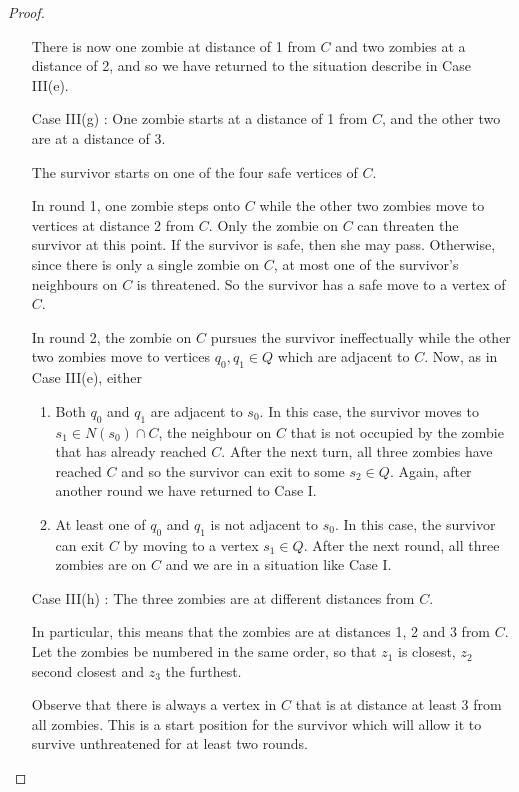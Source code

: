 \begin{proof}
\begin{enumerate}[I.]
There is now one zombie at distance of 1 from $C$ and two zombies at a distance of 2, and so we have returned to the situation describe in Case III(e).

\item[Case III(g)]: One zombie starts at a distance of 1 from $C$, and the other two are at a distance of 3.

The survivor starts on one of the four safe vertices of $C$.

In round 1, one zombie steps onto $C$ while the other two zombies move to vertices at distance 2 from $C$.
Only the zombie on $C$ can threaten the survivor at this point. If the survivor is safe, then she may pass. Otherwise, since there is
only a single zombie on $C$, at most one of the survivor's neighbours on $C$ is threatened.
So the survivor has a safe move to a vertex of $C$.

In round 2, the zombie on $C$ pursues the survivor ineffectually while the other two zombies move to vertices $q_0, q_1 \in Q$ which are
adjacent to $C$. Now, as in Case III(e), either

\begin{enumerate}
\item Both $q_0$ and $q_1$ are adjacent to $s_0$. In this case, the survivor moves to $s_1 \in N(s_0) \cap C$, the neighbour on $C$ that is not occupied
by the zombie that has already reached $C$. After the next turn, all three zombies have reached $C$ and so the survivor can
exit to some $s_2 \in Q$. Again, after another round we have returned to Case I.

\item At least one of $q_0$ and $q_1$ is not adjacent to $s_0$. In this case, the survivor can exit $C$ by moving to a vertex $s_1 \in Q$. After the next
round, all three zombies are on $C$ and we are in a situation like Case I.
\end{enumerate}

\item[Case III(h)]: The three zombies are at different distances from $C$.

In particular, this means that the zombies are at distances 1, 2 and 3 from $C$. Let the zombies be numbered in the same order, so that $z_1$ is closest, $z_2$ second closest and $z_3$ the furthest.

Observe that there is always a vertex in $C$ that is at distance at least 3 from all zombies. This is a start position for the survivor which
will allow it to survive unthreatened for at least two rounds.


\end{enumerate}
\end{proof}
